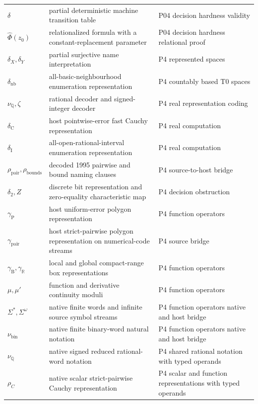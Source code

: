 \begin{longtable}{@{}p{}p{}p{}@{}}
\(\delta\) & partial deterministic machine transition table & P04 decision hardness validity \\
\(\widehat\Phi(z_0)\) & relationalized formula with a constant-replacement parameter & P04 decision hardness relational proof \\
\(\delta_X,\allowbreak \delta_Y\) & partial surjective name interpretation & P4 represented spaces \\
\(\delta_{\mathrm{nb}}\) & all-basic-neighbourhood enumeration representation & P4 countably based T0 spaces \\
\(\nu_{\mathbb Q},\allowbreak \zeta\) & rational decoder and signed-integer decoder & P4 real representation coding \\
\(\delta_{\mathrm C}\) & host pointwise-error fast Cauchy representation & P4 real computation \\
\(\delta_{\mathrm I}\) & all-open-rational-interval enumeration representation & P4 real computation \\
\(\rho_{\mathrm{pair}},\allowbreak \rho_{\mathrm{bounds}}\) & decoded 1995 pairwise and bound naming clauses & P4 source-\allowbreak{}to-\allowbreak{}host bridge \\
\(\delta_2,\allowbreak Z\) & discrete bit representation and zero-equality characteristic map & P4 decision obstruction \\
\(\gamma_{\mathrm P}\) & host uniform-error polygon representation & P4 function operators \\
\(\gamma_{\mathrm{pair}}\) & host strict-pairwise polygon representation on numerical-code streams & P4 source bridge \\
\(\gamma_{\mathrm B},\allowbreak \gamma_{\mathbb R}\) & local and global compact-range box representations & P4 function operators \\
\(\mu,\allowbreak \mu'\) & function and derivative continuity moduli & P4 function operators \\
\(\Sigma^*,\allowbreak \Sigma^\omega\) & native finite words and infinite source symbol streams & P4 function operators native and host bridge \\
\(\nu_{\mathrm{bin}}\) & native finite binary-word natural notation & P4 function operators native and host bridge \\
\(\nu_{\mathbb Q}\) & native signed reduced rational-word notation & P4 shared rational notation with typed operands \\
\(\rho_C\) & native scalar strict-pairwise Cauchy representation & P4 scalar and function representations with typed operands \\

\end{longtable}

